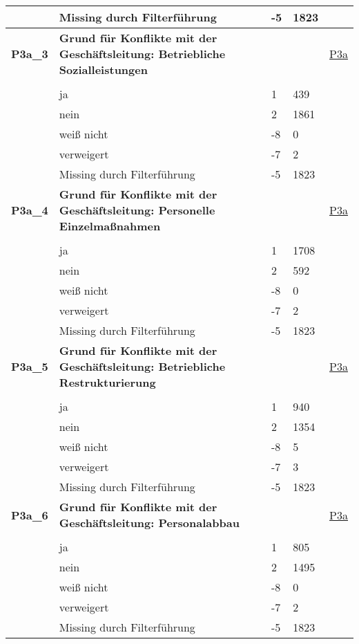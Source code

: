 \begin{longtable}{| L{2.5cm} | L{8.25cm}| C{1.5cm} | R{1.25cm} | C{2.25cm} |  }
   & Missing durch Filterführung & -5 & 1823 &  \\ 
   \midrule
\textbf{P3a\_3}\label{var:suf:P3a:3} & \textbf{Grund für Konflikte mit der Geschäftsleitung: Betriebliche Sozialleistungen} &  &  & \hyperref[P3a]{P3a} \\ 
   &  &  &  &  \\ 
   & ja & 1 & 439 &  \\ 
   & nein & 2 & 1861 &  \\ 
   & weiß nicht & -8 & 0 &  \\ 
   & verweigert & -7 & 2 &  \\ 
   & Missing durch Filterführung & -5 & 1823 &  \\ 
   \midrule
\textbf{P3a\_4}\label{var:suf:P3a:4} & \textbf{Grund für Konflikte mit der Geschäftsleitung: Personelle Einzelmaßnahmen} &  &  & \hyperref[P3a]{P3a} \\ 
   &  &  &  &  \\ 
   & ja & 1 & 1708 &  \\ 
   & nein & 2 & 592 &  \\ 
   & weiß nicht & -8 & 0 &  \\ 
   & verweigert & -7 & 2 &  \\ 
   & Missing durch Filterführung & -5 & 1823 &  \\ 
   \midrule
\textbf{P3a\_5}\label{var:suf:P3a:5} & \textbf{Grund für Konflikte mit der Geschäftsleitung: Betriebliche Restrukturierung} &  &  & \hyperref[P3a]{P3a} \\ 
   &  &  &  &  \\ 
   & ja & 1 & 940 &  \\ 
   & nein & 2 & 1354 &  \\ 
   & weiß nicht & -8 & 5 &  \\ 
   & verweigert & -7 & 3 &  \\ 
   & Missing durch Filterführung & -5 & 1823 &  \\ 
   \midrule
\textbf{P3a\_6}\label{var:suf:P3a:6} & \textbf{Grund für Konflikte mit der Geschäftsleitung: Personalabbau} &  &  & \hyperref[P3a]{P3a} \\ 
   &  &  &  &  \\ 
   & ja & 1 & 805 &  \\ 
   & nein & 2 & 1495 &  \\ 
   & weiß nicht & -8 & 0 &  \\ 
   & verweigert & -7 & 2 &  \\ 
   & Missing durch Filterführung & -5 & 1823 &  \\ 

\end{longtable}
